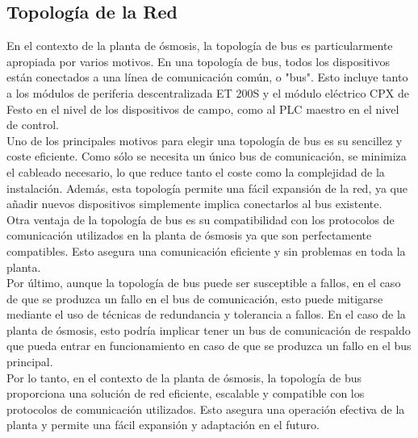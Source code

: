 \subsection{Topología de la Red}

En el contexto de la planta de ósmosis, la topología de bus es particularmente apropiada por varios motivos. En una topología de bus, todos los dispositivos están conectados a una línea de comunicación común, o "bus". Esto incluye tanto a los módulos de periferia descentralizada ET 200S y el módulo eléctrico CPX de Festo en el nivel de los dispositivos de campo, como al PLC maestro en el nivel de control.\\

Uno de los principales motivos para elegir una topología de bus es su sencillez y coste eficiente. Como sólo se necesita un único bus de comunicación, se minimiza el cableado necesario, lo que reduce tanto el coste como la complejidad de la instalación. Además, esta topología permite una fácil expansión de la red, ya que añadir nuevos dispositivos simplemente implica conectarlos al bus existente.\\

Otra ventaja de la topología de bus es su compatibilidad con los protocolos de comunicación utilizados en la planta de ósmosis ya que
son perfectamente compatibles. Esto asegura una comunicación eficiente y sin problemas en toda la planta.\\

Por último, aunque la topología de bus puede ser susceptible a fallos, en el caso de que se produzca un fallo en el bus de comunicación, esto puede mitigarse mediante el uso de técnicas de redundancia y tolerancia a fallos. En el caso de la planta de ósmosis, esto podría implicar tener un bus de comunicación de respaldo que pueda entrar en funcionamiento en caso de que se produzca un fallo en el bus principal.\\

Por lo tanto, en el contexto de la planta de ósmosis, la topología de bus proporciona una solución de red eficiente, escalable y compatible con los protocolos de comunicación utilizados. Esto asegura una operación efectiva de la planta y permite una fácil expansión y adaptación en el futuro.\\
